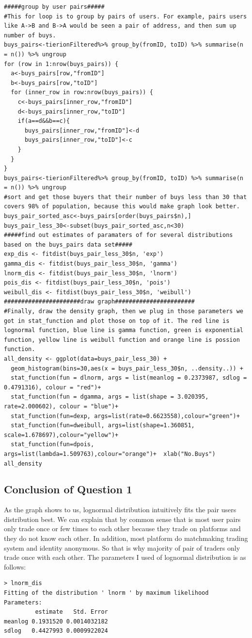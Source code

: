 \documentclass[11pt, letterpaper]{article} %
\begin{document}
\begin{lstlisting}
#####group by user pairs#####
#This for loop is to group by pairs of users. For example, pairs users like A->B and B->A would be seen a pair of address, and then sum up number of buys.
buys_pairs<-tierionFiltered%>% group_by(fromID, toID) %>% summarise(n = n()) %>% ungroup
for (row in 1:nrow(buys_pairs)) {
  a<-buys_pairs[row,"fromID"]
  b<-buys_pairs[row,"toID"]
  for (inner_row in row:nrow(buys_pairs)) {
    c<-buys_pairs[inner_row,"fromID"]
    d<-buys_pairs[inner_row,"toID"]
    if(a==d&&b==c){
      buys_pairs[inner_row,"fromID"]<-d
      buys_pairs[inner_row,"toID"]<-c
    }
  }
}
buys_pairs<-tierionFiltered%>% group_by(fromID, toID) %>% summarise(n = n()) %>% ungroup
#sort and get those buyers that their number of buys less than 30 that covers 98% of population, because this would make graph look better.
buys_pair_sorted_asc<-buys_pairs[order(buys_pairs$n),]
buys_pair_less_30<-subset(buys_pair_sorted_asc,n<30)
#####find out estimates of paramaters of for several distributions based on the buys_pairs data set#####
exp_dis <- fitdist(buys_pair_less_30$n, 'exp')
gamma_dis <- fitdist(buys_pair_less_30$n, 'gamma')
lnorm_dis <- fitdist(buys_pair_less_30$n, 'lnorm')
pois_dis <- fitdist(buys_pair_less_30$n, 'pois')
weibull_dis <- fitdist(buys_pair_less_30$n, 'weibull')
######################draw graph#######################
#Finally, draw the density graph, then we plug in those parameters we got in stat_function and plot those on top of it. The red line is lognormal function, blue line is gamma function, green is exponential function, yellow line is weibull function and orange line is possion function.
all_density <- ggplot(data=buys_pair_less_30) +
  geom_histogram(bins=30,aes(x = buys_pair_less_30$n, ..density..)) +
  stat_function(fun = dlnorm, args = list(meanlog = 0.2373987, sdlog = 0.4791316), colour = "red")+
  stat_function(fun = dgamma, args = list(shape = 3.020395, rate=2.000602), colour = "blue")+
  stat_function(fun=dexp, args=list(rate=0.6623558),colour="green")+
  stat_function(fun=dweibull, args=list(shape=1.360851, scale=1.678697),colour="yellow")+
  stat_function(fun=dpois, args=list(lambda=1.509763),colour="orange")+  xlab("No.Buys")
all_density
\end{lstlisting}


\subsection*{Conclusion of Question 1}
As the graph shows to us, lognormal distribution intuitively fits the pair users distribution best. We can explain that by common sense that is most user pairs only trade once or few times to each other because they trade on platforms and they do not know each other. In addition, most platform do matchmaking trading system and identity anonymous. So that is why majority of pair of traders only trade once with each other.
The parameters I used of lognormal distribution is as follows:
\lstset{language=R}
\begin{lstlisting}
> lnorm_dis
Fitting of the distribution ' lnorm ' by maximum likelihood
Parameters:
         estimate   Std. Error
meanlog 0.1931520 0.0014032182
sdlog   0.4427993 0.0009922024
\end{lstlisting}
\end{document}
